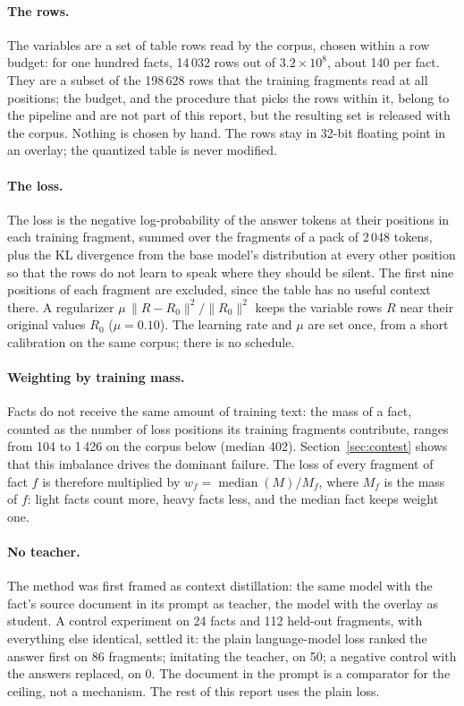 \documentclass[10pt,a4paper]{article}
\begin{document}
\paragraph{The rows.} The variables are a set of table rows read by the corpus, chosen
within a row budget: for one hundred facts, 14\,032 rows out of $3.2\times10^{8}$, about 140
per fact. They are a subset of the 198\,628 rows that the training fragments read at all
positions; the budget, and the procedure that picks the rows within it, belong to the
pipeline and are not part of this report, but the resulting set is released with the
corpus. Nothing is chosen by hand. The rows stay in 32-bit floating point in an overlay;
the quantized table is never modified.

\paragraph{The loss.} The loss is the negative log-probability of the answer tokens at
their positions in each training fragment, summed over the fragments of a pack of
2\,048 tokens, plus the KL divergence from the base model's distribution at every other
position so that the rows do not learn to speak where they should be silent. The first
nine positions of each fragment are excluded, since the table has no useful context there.
A regularizer $\mu\,\lVert R - R_0\rVert^2/\lVert R_0\rVert^2$ keeps the variable rows $R$
near their original values $R_0$ ($\mu = 0.10$). The learning rate and $\mu$ are set once,
from a short calibration on the same corpus; there is no schedule.

\paragraph{Weighting by training mass.} Facts do not receive the same amount of training
text: the mass of a fact, counted as the number of loss positions its training fragments
contribute, ranges from 104 to 1\,426 on the corpus below (median 402).
Section~\ref{sec:contest} shows that this imbalance drives the dominant failure. The loss of
every fragment of fact $f$ is therefore multiplied by $w_f = \operatorname{median}(M)/M_f$,
where $M_f$ is the mass of $f$: light facts count more, heavy facts less, and the median fact
keeps weight one.

\paragraph{No teacher.} The method was first framed as context distillation: the same
model with the fact's source document in its prompt as teacher, the model with the overlay
as student. A control experiment on 24 facts and 112 held-out fragments, with everything
else identical, settled it: the plain language-model loss ranked the answer first on 86
fragments; imitating the teacher, on 50; a negative control with the answers replaced, on
0. The document in the prompt is a comparator for the ceiling, not a mechanism. The rest
of this report uses the plain loss.
\end{document}
